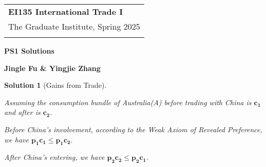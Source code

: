 \documentclass[a4paper,12pt]{article} %
\theoremstyle{nonitalic}
\newtheorem{solution}{Solution}
\begin{document}
\thispagestyle{empty} %

\begin{tabular}{p{15.5cm}} %
{\large \bf EI135 International Trade I} \\
The Graduate Institute, Spring 2025\\
\hline %
\\
\end{tabular} %

\vspace*{0.3cm} %

\begin{center} %
	{\Large \bf PS1 Solutions} %
	\vspace{2mm}
	
	{\bf Jingle Fu \& Yingjie Zhang} %
		
\end{center}  

\vspace{0.4cm}

\begin{solution}[Gains from Trade]
    \

    Assuming the consumption bundle of Australia(A) before trading with China is $\mathbf{c_1}$ and after is $\mathbf{c_2}$.

    Before China's involvement, according to the Weak Axiom of Revealed Preference, we have $\mathbf{p_1} \mathbf{c_1} \leq \mathbf{p_1} \mathbf{c_2}.$

    After China's entering, we have $\mathbf{p_2} \mathbf{c_2} \leq \mathbf{p_2} \mathbf{c_1}.$
\end{solution}
\end{document}
